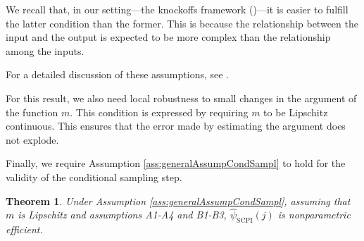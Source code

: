 \documentclass{article}
\theoremstyle{plain}
\newtheorem{theorem}{Theorem}[section]
\theoremstyle{definition}
\theoremstyle{remark}
\begin{document}
We recall that, in our setting—the knockoffs framework (\citet{candes2017panninggoldmodelxknockoffs})—it is easier to fulfill the latter condition than the former. This is because the relationship between the input and the output is expected to be more complex than the relationship among the inputs.

For a detailed discussion of these assumptions, see \citet{williamson2023general}.


For this result, we also need local robustness to small changes in the argument of the function $m$. This condition is expressed by requiring $m$ to be Lipschitz continuous. This ensures that the error made by estimating the argument does not explode.

Finally, we require Assumption \ref{ass:generalAssumpCondSampl} to hold for the validity of the conditional sampling step.


\begin{theorem}
Under Assumption \ref{ass:generalAssumpCondSampl}, assuming that $m$ is Lipschitz and assumptions A1-A4 and B1-B3,  $\widehat{\psi}_\mathrm{SCPI}(j)$ is nonparametric efficient.
\end{theorem}
\end{document}
